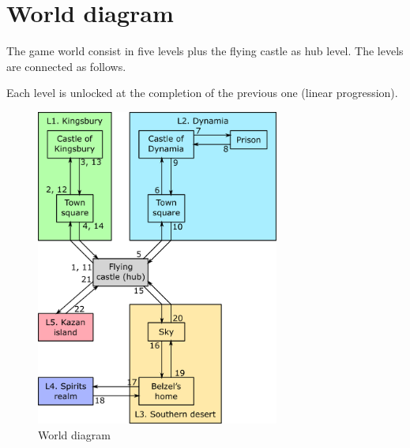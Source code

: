 \section{World diagram}

The game world consist in five levels plus the flying castle as hub level. The levels are connected as follows.

Each level is unlocked at the completion of the previous one (linear progression).

\begin{figure}[H]
  \centering
  \includegraphics[width=8cm]{Images/Diagrams/worldDiagram}
  \caption{World diagram}
\end{figure}
